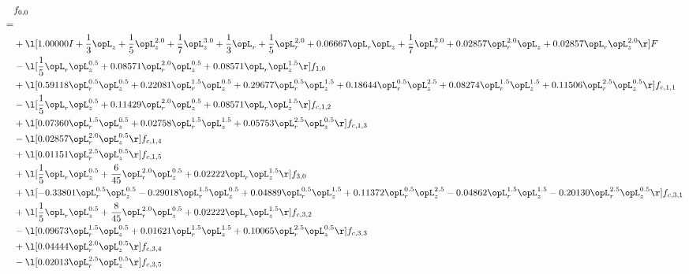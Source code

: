 \begin{alignat}{2} 
\label{eq:f_00_1} 
& f_{0,0} \nonumber \\ 
 = \\ 
& + \l[  1.00000 I + \frac{1}{3} \opL_z + \frac{1}{5} \opL_z^{2.0} + \frac{1}{7} \opL_z^{3.0} + \frac{1}{3} \opL_r + \frac{1}{5} \opL_r^{2.0} +  0.06667 \opL_r \opL_z + \frac{1}{7} \opL_r^{3.0} +  0.02857 \opL_r^{2.0} \opL_z +  0.02857 \opL_r \opL_z^{2.0}  \r] F \nonumber \\ 
& - \l[ \frac{1}{5} \opL_r \opL_z^{0.5} +  0.08571 \opL_r^{2.0} \opL_z^{0.5} +  0.08571 \opL_r \opL_z^{1.5}  \r] f_{1,0} \nonumber \\ 
& + \l[  0.59118 \opL_r^{0.5} \opL_z^{0.5} +  0.22081 \opL_r^{1.5} \opL_z^{0.5} +  0.29677 \opL_r^{0.5} \opL_z^{1.5} +  0.18644 \opL_r^{0.5} \opL_z^{2.5} +  0.08274 \opL_r^{1.5} \opL_z^{1.5} +  0.11506 \opL_r^{2.5} \opL_z^{0.5}  \r] f_{c,1,1} \nonumber \\ 
& - \l[ \frac{1}{5} \opL_r \opL_z^{0.5} +  0.11429 \opL_r^{2.0} \opL_z^{0.5} +  0.08571 \opL_r \opL_z^{1.5}  \r] f_{c,1,2} \nonumber \\ 
& + \l[  0.07360 \opL_r^{1.5} \opL_z^{0.5} +  0.02758 \opL_r^{1.5} \opL_z^{1.5} +  0.05753 \opL_r^{2.5} \opL_z^{0.5}  \r] f_{c,1,3} \nonumber \\ 
& - \l[  0.02857 \opL_r^{2.0} \opL_z^{0.5}  \r] f_{c,1,4} \nonumber \\ 
& + \l[  0.01151 \opL_r^{2.5} \opL_z^{0.5}  \r] f_{c,1,5} \nonumber \\ 
& + \l[ \frac{1}{5} \opL_r \opL_z^{0.5} + \frac{6}{45} \opL_r^{2.0} \opL_z^{0.5} +  0.02222 \opL_r \opL_z^{1.5}  \r] f_{3,0} \nonumber \\ 
& + \l[  -0.33801 \opL_r^{0.5} \opL_z^{0.5}   -0.29018 \opL_r^{1.5} \opL_z^{0.5} +  0.04889 \opL_r^{0.5} \opL_z^{1.5} +  0.11372 \opL_r^{0.5} \opL_z^{2.5}   -0.04862 \opL_r^{1.5} \opL_z^{1.5}   -0.20130 \opL_r^{2.5} \opL_z^{0.5}  \r] f_{c,3,1} \nonumber \\ 
& + \l[ \frac{1}{5} \opL_r \opL_z^{0.5} + \frac{8}{45} \opL_r^{2.0} \opL_z^{0.5} +  0.02222 \opL_r \opL_z^{1.5}  \r] f_{c,3,2} \nonumber \\ 
& - \l[  0.09673 \opL_r^{1.5} \opL_z^{0.5} +  0.01621 \opL_r^{1.5} \opL_z^{1.5} +  0.10065 \opL_r^{2.5} \opL_z^{0.5}  \r] f_{c,3,3} \nonumber \\ 
& + \l[  0.04444 \opL_r^{2.0} \opL_z^{0.5}  \r] f_{c,3,4} \nonumber \\ 
& - \l[  0.02013 \opL_r^{2.5} \opL_z^{0.5}  \r] f_{c,3,5} \nonumber \\ 

\end{alignat}
